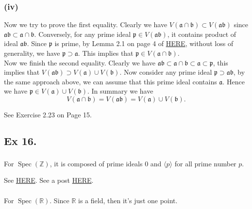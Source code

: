 \subsubsection{(iv)} Now we try to prove the first equality. Clearly we have $V(\mathfrak a \cap \mathfrak b)\subset V(\mathfrak a\mathfrak b)$ since $\mathfrak a\mathfrak b\subset \mathfrak a\cap \mathfrak b$. Conversely, for any prime ideal $\mathfrak p\in V(\mathfrak a\mathfrak b)$, it contains product of ideal $\mathfrak a\mathfrak b$. Since $\mathfrak p$ is prime, by Lemma 2.1 on page 4 of \href{https://www.jmilne.org/math/xnotes/CA.pdf}{HERE}, without loss of generality, we have $\mathfrak p\supset \mathfrak a$. This implies that $\mathfrak p\in V(\mathfrak a\cap\mathfrak b)$.\\

\noindent Now we finish the second equality. Clearly we have $\mathfrak a\mathfrak b\subset \mathfrak a\cap \mathfrak b\subset \mathfrak a\subset \mathfrak p$, this implies that $V(\mathfrak{ab})\supset V(\mathfrak a)\cup V(\mathfrak b)$. Now consider any prime ideal $\mathfrak p\supset \mathfrak {ab}$, by the same approach above, we can assume that this prime ideal contains $\mathfrak a$. Hence we have $\mathfrak p\in V(\mathfrak a)\cup V(\mathfrak b)$.
In summary we have $$V(\mathfrak a\cap \mathfrak b)=V(\mathfrak{ab})=V(\mathfrak a)\cup V(\mathfrak b).$$

See \cite{altman} Exercise 2.23 on Page 15. 



\subsection{Ex 16.}

\subsubsection{}
For $\operatorname{Spec}(\mathbb Z)$, it is composed of prime ideals $0$ and $\langle p\rangle$ for all prime number $p$.

See \href{https://ncatlab.org/nlab/show/Spec%28Z%29}{HERE}. 
See a post \href{https://math.stackexchange.com/questions/4008952/drawing-a-picture-of-operatornamespec-mathbbz}{HERE}. 

\subsubsection{}
For $\operatorname{Spec}(\mathbb R)$.
Since $\mathbb R$ is a field, then it's just one point.

